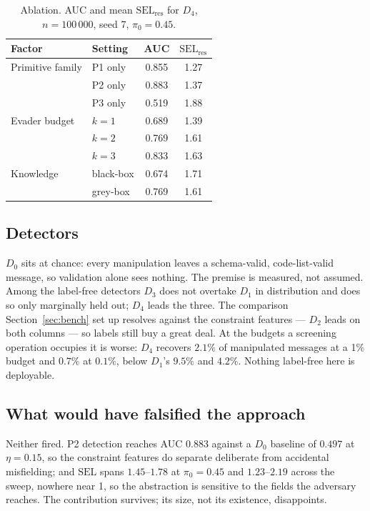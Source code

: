 \documentclass[conference]{IEEEtran}
\begin{document}
\begin{table}[!tbp]
\caption{Ablation. AUC and mean $\mathrm{SEL_{res}}$ for $D_4$,
$n=100\,000$, seed 7, $\pi_0=0.45$.}
\label{tab:ablation}
\centering
\footnotesize
\begin{tabular}{@{}llcc@{}}
\toprule
Factor & Setting & AUC & $\mathrm{SEL_{res}}$ \\
\midrule
Primitive family & P1 only & 0.855 & 1.27 \\
 & P2 only & 0.883 & 1.37 \\
 & P3 only & 0.519 & 1.88 \\
Evader budget & $k=1$ & 0.689 & 1.39 \\
 & $k=2$ & 0.769 & 1.61 \\
 & $k=3$ & 0.833 & 1.63 \\
Knowledge & black-box & 0.674 & 1.71 \\
 & grey-box & 0.769 & 1.61 \\
\bottomrule
\end{tabular}
\end{table}

\subsection{Detectors}
$D_0$ sits at chance: every manipulation leaves a schema-valid,
code-list-valid message, so validation alone sees nothing. The premise is
measured, not assumed. Among the label-free detectors $D_3$ does not
overtake $D_1$ in distribution and does so only marginally held out; $D_4$
leads the three. The comparison Section~\ref{sec:bench} set up resolves
against the constraint features --- $D_2$ leads on both columns --- so
labels still buy a great deal. At the budgets a screening operation occupies
it is worse: $D_4$ recovers $2.1\%$ of manipulated messages at a 1\% budget
and $0.7\%$ at $0.1\%$, below $D_1$'s $9.5\%$ and $4.2\%$. Nothing
label-free here is deployable.

\subsection{What would have falsified the approach}
Neither fired. P2 detection reaches AUC $0.883$ against a $D_0$ baseline of
$0.497$ at $\eta=0.15$, so the constraint features do separate deliberate
from accidental misfielding; and $\mathrm{SEL}$ spans $1.45$--$1.78$ at
$\pi_0=0.45$ and $1.23$--$2.19$ across the sweep, nowhere near 1, so the
abstraction is sensitive to the fields the adversary reaches. The
contribution survives; its size, not its existence, disappoints.
\end{document}
